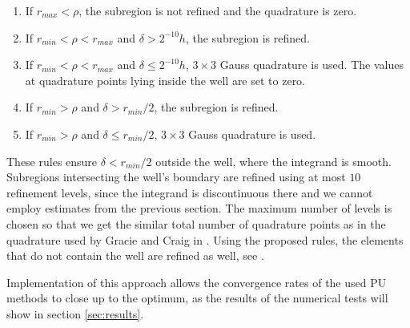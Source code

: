 
\begin{enumerate}
 \item If $r_{max} < \rho$, the subregion is not refined and the quadrature is zero.
 \item If $r_{min} < \rho < r_{max}$ and $\delta > 2^{-10}h$, the subregion is refined.
 \item If $r_{min} < \rho < r_{max}$ and $\delta \le 2^{-10}h$, $3\times3$ Gauss quadrature is used.
 The values at quadrature points lying inside the well are set to zero.
 \item If $r_{min} > \rho$ and $\delta > r_{min} / 2$, the subregion is refined.
 \item If $r_{min} > \rho$ and $\delta \le r_{min} / 2$, $3\times3$ Gauss quadrature is used.
\end{enumerate}


These rules ensure $\delta < r_{min}/2$ outside the well, where the integrand is smooth. Subregions intersecting 
the well's boundary are refined using at most $10$ refinement levels, since the integrand is discontinuous there and we cannot employ 
estimates from the previous section. The maximum number of levels is chosen so that we get the similar total number of quadrature points 
as in the quadrature used by Gracie and Craig in \cite{gracie_modelling_2010}. Using the proposed rules, the elements that do not contain the well are refined as well,
see . 

Implementation of this approach allows the convergence rates of the used PU methods to close up to the optimum,
as the results of the numerical tests will show in section \ref{sec:results}.


